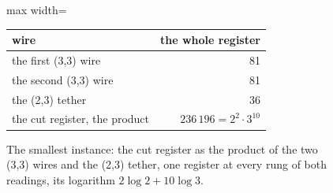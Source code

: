 \begin{figure}[h]
\centering
\begin{adjustbox}{max width=\linewidth}\begin{tabular}{lr}
\hline
wire & the whole register \\
\hline
the first (3,3) wire & 81 \\
the second (3,3) wire & 81 \\
the (2,3) tether & 36 \\
the cut register, the product & $236\,196 = 2^{2}\cdot 3^{10}$ \\
\hline
\end{tabular}\end{adjustbox}
\caption{The smallest instance: the cut register as the product of the two (3,3) wires and the (2,3) tether, one register at every rung of both readings, its logarithm $2\log 2 + 10\log 3$.}
\end{figure}
